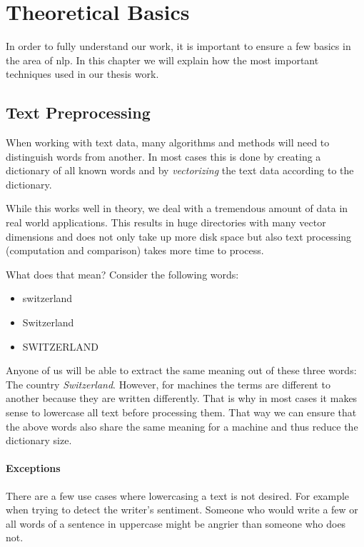 \section{Theoretical Basics}
\label{sec:3_theoretical_basics}

In order to fully understand our work,
it is important to ensure a few basics in the area of \Gls{nlp}.
In this chapter we will explain how the most important techniques used in our thesis work.

\subsection{Text Preprocessing}
\label{subsec:3_text_preprocessing}

When working with text data, many algorithms and methods will need to distinguish words from another.
In most cases this is done by creating a dictionary of all known words and by \textit{vectorizing} the text data
according to the dictionary.

While this works well in theory, we deal with a tremendous amount of data in real world applications.
This results in huge directories with many vector dimensions and does not only take up more disk space
but also text processing (computation and comparison) takes more time to process.

What does that mean?
Consider the following words:

\begin{itemize}
    \item switzerland
    \item Switzerland
    \item SWITZERLAND
\end{itemize}

Anyone of us will be able to extract the same meaning out of these three words: The country \textit{Switzerland}.
However, for machines the terms are different to another because they are written differently.
That is why in most cases it makes sense to lowercase all text before processing them.
That way we can ensure that the above words also share the same meaning
for a machine and thus reduce the dictionary size.

\paragraph{Exceptions}
There are a few use cases where lowercasing a text is not desired.
For example when trying to detect the writer's sentiment.
Someone who would write a few or all words of a sentence in uppercase might be angrier than someone who does not.

